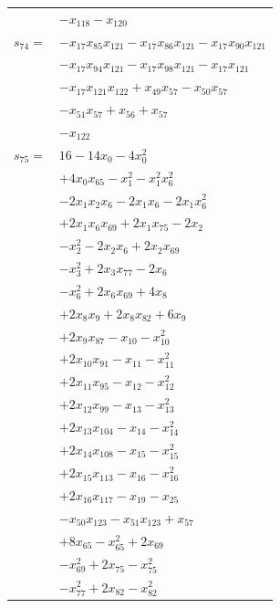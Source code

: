\begin{longtable}{@{}r@{\;}l@{}}
 & \(\displaystyle -x_{118} -x_{120}\) \\[3pt]
\(s_{74}=\) & \(\displaystyle -x_{17}x_{85}x_{121} -x_{17}x_{86}x_{121} -x_{17}x_{90}x_{121}\) \\
 & \(\displaystyle -x_{17}x_{94}x_{121} -x_{17}x_{98}x_{121} -x_{17}x_{121}\) \\
 & \(\displaystyle -x_{17}x_{121}x_{122} +x_{49}x_{57} -x_{50}x_{57}\) \\
 & \(\displaystyle -x_{51}x_{57} +x_{56} +x_{57}\) \\
 & \(\displaystyle -x_{122}\) \\[3pt]
\(s_{75}=\) & \(\displaystyle 16 -14x_{0} -4x_{0}^{2}\) \\
 & \(\displaystyle +4x_{0}x_{65} -x_{1}^{2} -x_{1}^{2}x_{6}^{2}\) \\
 & \(\displaystyle -2x_{1}x_{2}x_{6} -2x_{1}x_{6} -2x_{1}x_{6}^{2}\) \\
 & \(\displaystyle +2x_{1}x_{6}x_{69} +2x_{1}x_{75} -2x_{2}\) \\
 & \(\displaystyle -x_{2}^{2} -2x_{2}x_{6} +2x_{2}x_{69}\) \\
 & \(\displaystyle -x_{3}^{2} +2x_{3}x_{77} -2x_{6}\) \\
 & \(\displaystyle -x_{6}^{2} +2x_{6}x_{69} +4x_{8}\) \\
 & \(\displaystyle +2x_{8}x_{9} +2x_{8}x_{82} +6x_{9}\) \\
 & \(\displaystyle +2x_{9}x_{87} -x_{10} -x_{10}^{2}\) \\
 & \(\displaystyle +2x_{10}x_{91} -x_{11} -x_{11}^{2}\) \\
 & \(\displaystyle +2x_{11}x_{95} -x_{12} -x_{12}^{2}\) \\
 & \(\displaystyle +2x_{12}x_{99} -x_{13} -x_{13}^{2}\) \\
 & \(\displaystyle +2x_{13}x_{104} -x_{14} -x_{14}^{2}\) \\
 & \(\displaystyle +2x_{14}x_{108} -x_{15} -x_{15}^{2}\) \\
 & \(\displaystyle +2x_{15}x_{113} -x_{16} -x_{16}^{2}\) \\
 & \(\displaystyle +2x_{16}x_{117} -x_{19} -x_{25}\) \\
 & \(\displaystyle -x_{50}x_{123} -x_{51}x_{123} +x_{57}\) \\
 & \(\displaystyle +8x_{65} -x_{65}^{2} +2x_{69}\) \\
 & \(\displaystyle -x_{69}^{2} +2x_{75} -x_{75}^{2}\) \\
 & \(\displaystyle -x_{77}^{2} +2x_{82} -x_{82}^{2}\) \\

\end{longtable}
